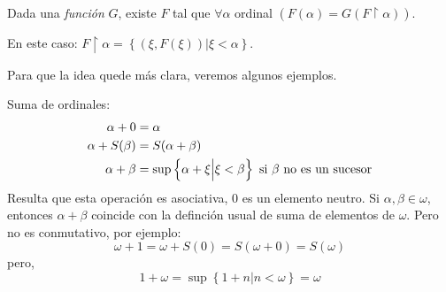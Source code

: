 \documentclass[12pt]{report}
\newcounter{it}
\theoremstyle{largebreak}
\begin{document}
    \begin{theor}
        Dada una \textit{función} $G$, existe $F$ tal que $\forall\alpha$ ordinal $(F(\alpha)=G(F\upharpoonright\alpha))$.
    \end{theor}

    \begin{obs}
        En este caso: $F\upharpoonright\alpha=\left\{(\xi,F(\xi))\Big|\xi<\alpha \right\}$.
    \end{obs}

    Para que la idea quede más clara, veremos algunos ejemplos.

    \begin{exa}
        Suma de ordinales:
        \begin{equation*}
            \begin{split}
                \alpha+0&=\alpha\\
                \alpha+S(\beta)&=S(\alpha+\beta)\\
                \alpha+\beta&=\sup\left\{\alpha+\xi\Big|\xi<\beta \right\}\textup{ si $\beta$ no es un sucesor} \\
            \end{split}
        \end{equation*}
        Resulta que esta operación es asociativa, $0$ es un elemento neutro. Si $\alpha,\beta\in\omega$, entonces $\alpha+\beta$ coincide con la definción usual de suma de elementos de $\omega$. Pero no es conmutativo, por ejemplo:
        \begin{equation*}
            \omega+1=\omega+S(0)=S(\omega+0)=S(\omega)
        \end{equation*}
        pero,
        \begin{equation*}
            1+\omega=\sup\left\{1+n\Big|n<\omega \right\}=\omega
        \end{equation*}
    \end{exa}
\end{document}
